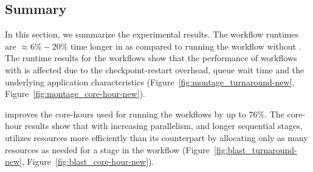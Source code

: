 %
%
%
%

\vspace{-0.2cm}
\subsection{Summary}
In this section, we summarize the experimental results.
The workflow runtimes are $\approx 6\% - 20\%$ time longer in \systemname as compared
to running the workflow without \systemname. The runtime results for
the workflows show that the performance of workflows with \systemname
is affected due to the checkpoint-restart overhead, queue wait time and the underlying
application characteristics (Figure~\ref{fig:montage_turnaround-new}, Figure~\ref{fig:montage_core-hour-new}). 

\systemname improves the core-hours used for running the workflows by up to
$76 \%$. The core-hour results show that with increasing parallelism,
and longer sequential stages, \systemname utilizes resources more efficiently
than its counterpart by allocating only as many resources as needed for
a stage in the workflow (Figure~\ref{fig:blast_turnaround-new}, Figure~\ref{fig:blast_core-hour-new}).

